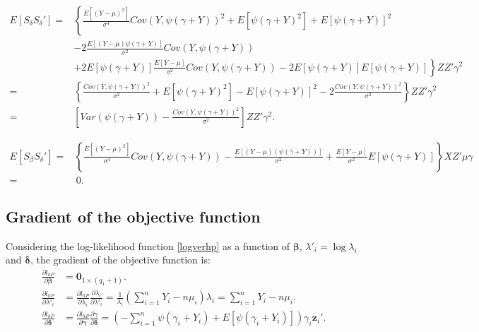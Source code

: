 \begin{align*}
E\left[S_{\delta}S_{\delta}'\right] = &
    \left\{ \frac{E\left[\left(Y - \mu\right)^2\right]}{\sigma^4}Cov\left(Y, \psi\left(\gamma + Y\right)\right)^2 + E\left[\psi\left(\gamma + Y\right)^2\right] + E\left[\psi\left(\gamma + Y\right)\right]^2 \right.\\
    & - 2 \frac{E\left[\left(Y - \mu\right)\psi\left(\gamma + Y\right)\right]}{\sigma^2}Cov\left(Y, \psi\left(\gamma + Y\right)\right) \\
    & \left. + 2 E\left[\psi\left(\gamma + Y\right)\right] \frac{E\left[Y - \mu\right]}{\sigma^2}Cov\left(Y, \psi\left(\gamma + Y\right)\right)
    - 2 E\left[\psi\left(\gamma + Y\right)\right]E\left[\psi\left(\gamma + Y\right)\right] \right\} ZZ' \gamma^2 \\
    = & \left\{ \frac{Cov\left(Y, \psi\left(\gamma + Y\right)\right)^2}{\sigma^2} + E\left[\psi\left(\gamma + Y\right)^2\right] - E\left[\psi\left(\gamma + Y\right)\right]^2 - 2 \frac{Cov\left(Y, \psi\left(\gamma + Y\right)\right)^2}{\sigma^2} \right\} ZZ' \gamma^2 \\
    = & \left[ Var\left(\psi\left(\gamma + Y\right)\right) - \frac{Cov\left(Y, \psi\left(\gamma + Y\right)\right)^2}{\sigma^2} \right] ZZ' \gamma^2.
\end{align*}

\begin{align*}
    E\left[S_{\beta}S_{\delta}' \right] = & \left\{ \frac{E\left[\left(Y - \mu \right)^2 \right]}{\sigma^4}Cov\left(Y, \psi\left(\gamma + Y \right) \right) - \frac{E\left[\left(Y - \mu \right)\left(\psi\left(\gamma + Y \right) \right) \right]}{\sigma^2} + \frac{E\left[Y - \mu \right]}{\sigma^2}E\left[\psi\left(\gamma + Y \right) \right] \right\} XZ'\mu \gamma  \\
    = & \, 0.
\end{align*}

\subsection{Gradient of the objective function}

Considering the log-likelihood function \eqref{logverhp} as a function of $ \boldsymbol{\beta} $, $ \lambda'_i = \log \lambda_i $ and $ \boldsymbol{\delta} $, the gradient of the objective function is:
\begin{align*}
   \frac{\partial l_{hP}}{\partial \boldsymbol{\beta}} & = \mathbf{0}_{1 \times (q_1+1)}. \\
   \frac{\partial l_{hP}}{\partial \lambda'_i} & = \frac{\partial l_{hP}}{\partial \lambda_i} \frac{\partial \lambda_i}{\partial \lambda'_i} = \frac{1}{\lambda_i} \left(\sum_{i=1}^n Y_i - n \mu_i \right) \lambda_i = \sum_{i=1}^n Y_i - n \mu_i. \\
   \frac{\partial l_{hP}}{\partial \boldsymbol{\delta}} & = \frac{\partial l_{hP}}{\partial \boldsymbol{\gamma}} \frac{\partial \gamma}{\partial \boldsymbol{\delta}} = \left( - \sum_{i=1}^n \psi\left(\gamma_i+Y_i\right) + E \left[ \psi\left(\gamma_i+Y_i\right) \right] \right) \gamma_i \mathbf{z}_i'.
\end{align*}

